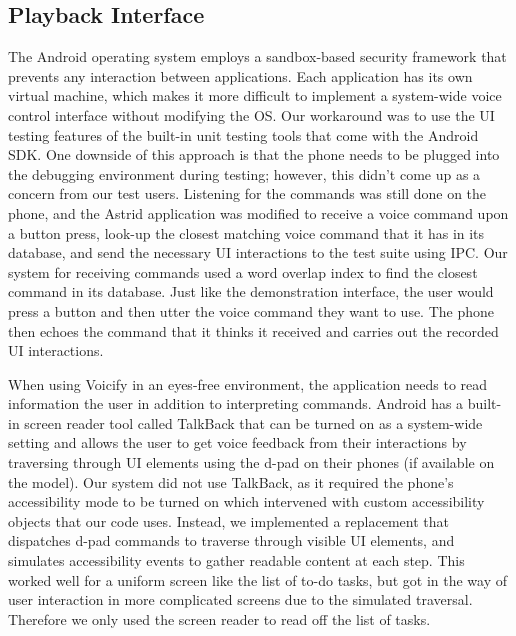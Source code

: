 \documentclass[letterpaper]{article}
\begin{document}
\subsection{Playback Interface}
The Android operating system employs a sandbox-based security framework that prevents any interaction between applications. 
Each application has its own virtual machine, which makes it more difficult to implement a system-wide voice control interface without modifying the OS.
Our workaround was to use the UI testing features of the built-in unit testing tools that come with the Android SDK.
One downside of this approach is that the phone needs to be plugged into the debugging environment during testing; however, 
this didn't come up as a concern from our test users. Listening for the commands was still done on the phone, 
and the Astrid application was modified to receive a voice command upon a button press, look-up the closest matching voice command 
that it has in its database, and send the necessary UI interactions to the test suite using IPC. Our system for receiving commands used 
a word overlap index to find the closest command in its database. Just like the demonstration interface, the user would press a button 
and then utter the voice command they want to use. The phone then echoes the command that it thinks it received and carries out the 
recorded UI interactions. 
 

When using Voicify in an eyes-free environment, the application needs to read information the user in addition to interpreting commands.
Android has a built-in screen reader tool called TalkBack that can be turned on as a system-wide setting and allows the user to get 
voice feedback from their interactions by traversing through UI elements using the d-pad on their phones (if available on the model). 
Our system did not use TalkBack, as it required the phone's accessibility mode to be turned on which intervened with 
custom accessibility objects that our code uses. Instead, we implemented a replacement that dispatches d-pad commands to traverse 
through visible UI elements, and simulates accessibility events to gather readable content at each step. This worked well for a uniform 
screen like the list of to-do tasks, but got in the way of user interaction in more complicated screens due to the simulated traversal. 
Therefore we only used the screen reader to read off the list of tasks.
\end{document}

